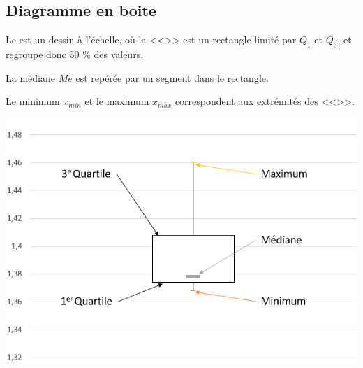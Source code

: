 \documentclass[12pt,a4paper]{article}
\begin{document}
\subsection{Diagramme en boite}

\begin{mydef}
	Le  est un dessin à l'échelle, où la <<>> est un rectangle limité par $Q_1$ et $Q_3$, et regroupe donc 50 \% des valeurs.
	
	La médiane $Me$ est repérée par un segment dans le rectangle.
	
	Le minimum $x_{min}$ et le maximum $x_{max}$ correspondent aux extrémités des <<>>.
\end{mydef}

\begin{center}
	\includegraphics[scale=0.7]{moustache}
\end{center}
\end{document}
